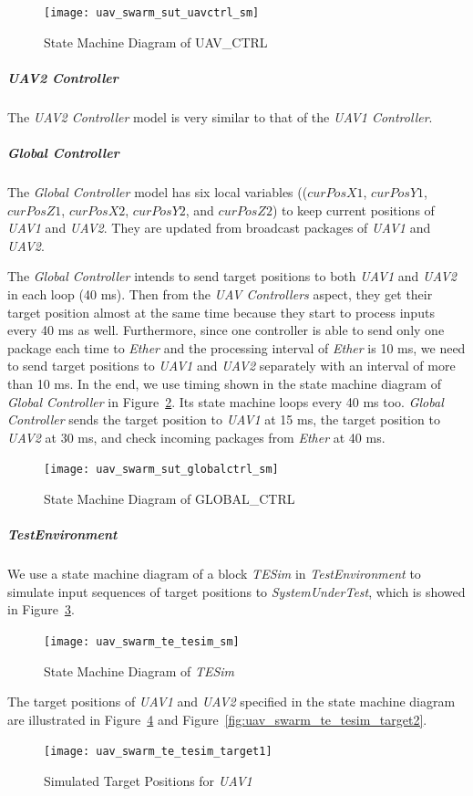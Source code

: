 \begin{figure}[htb!]
    \centering
    \texttt{[image: uav\_swarm\_sut\_uavctrl\_sm]}
    \caption{State Machine Diagram of UAV\_CTRL}
    \label{fig:uav_swarm_uavctrl_sm}
\end{figure}

\subparagraph{\emph{UAV2 Controller}}
The \emph{UAV2 Controller} model is very similar to that of the \emph{UAV1 Controller}.

\subparagraph{\emph{Global Controller}}
The \emph{Global Controller} model has six local variables (($curPosX1$, $curPosY1$, $curPosZ1$, $curPosX2$, $curPosY2$, and $curPosZ2$) to keep current positions of \emph{UAV1} and \emph{UAV2}. They are updated from broadcast packages of \emph{UAV1} and \emph{UAV2}.

The \emph{Global Controller} intends to send target positions to both \emph{UAV1} and \emph{UAV2} in each loop (40 ms). Then from the \emph{UAV Controllers} aspect, they get their target position almost at the same time because they start to process inputs every 40 ms as well. Furthermore, since one controller is able to send only one package each time to \emph{Ether} and the processing interval of \emph{Ether} is 10 ms, we need to send target positions to \emph{UAV1} and \emph{UAV2} separately with an interval of more than 10 ms. In the end, we use timing shown in the state machine diagram of \emph{Global Controller} in Figure~\ref{fig:uav_swarm_globalctrl_sm}. Its state machine loops every 40 ms too. \emph{Global Controller} sends the target position to \emph{UAV1} at 15 ms, the target position to \emph{UAV2} at 30 ms, and check incoming packages from \emph{Ether} at 40 ms.
\begin{figure}[htb!]
    \centering
	\texttt{[image: uav\_swarm\_sut\_globalctrl\_sm]}
    \caption{State Machine Diagram of GLOBAL\_CTRL}
    \label{fig:uav_swarm_globalctrl_sm}
\end{figure}

\subparagraph{\emph{TestEnvironment}}
We use a state machine diagram of a block \emph{TESim} in \emph{TestEnvironment} to simulate input sequences of target positions to \emph{SystemUnderTest}, which is showed in Figure~\ref{fig:uav_swarm_te_tesim_sm}.
\begin{figure}[htb!]
    \centering
	\texttt{[image: uav\_swarm\_te\_tesim\_sm]}
    \caption{State Machine Diagram of \emph{TESim}}
    \label{fig:uav_swarm_te_tesim_sm}
\end{figure}

The target positions of \emph{UAV1} and \emph{UAV2} specified in the state machine diagram are illustrated in Figure~\ref{fig:uav_swarm_te_tesim_target1} and Figure~\ref{fig:uav_swarm_te_tesim_target2}.
\begin{figure}[htb!]
    \centering
	\texttt{[image: uav\_swarm\_te\_tesim\_target1]}
    \caption{Simulated Target Positions for \emph{UAV1}}
    \label{fig:uav_swarm_te_tesim_target1}
\end{figure}


